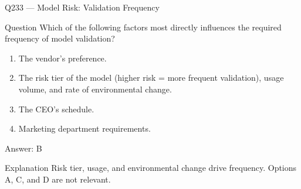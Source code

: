 \documentclass[aspectratio=169,8pt]{beamer}
\begin{document}
																																								\begin{frame}{Q233 --- Model Risk: Validation Frequency}
																																									\begin{block}{Question}
																																										Which of the following factors most directly influences the required frequency of model validation?
																																										\begin{enumerate}
																																											\item The vendor's preference.
																																											\item The risk tier of the model (higher risk = more frequent validation), usage volume, and rate of environmental change.
																																											\item The CEO's schedule.
																																											\item Marketing department requirements.
																																										\end{enumerate}  \end{block}
																																										\begin{exampleblock}{Answer: B}\end{exampleblock}
																																										\begin{block}{Explanation}
																																											Risk tier, usage, and environmental change drive frequency. Options A, C, and D are not relevant.
																																										\end{block}
																																									\end{frame}
																																									
\end{document}
